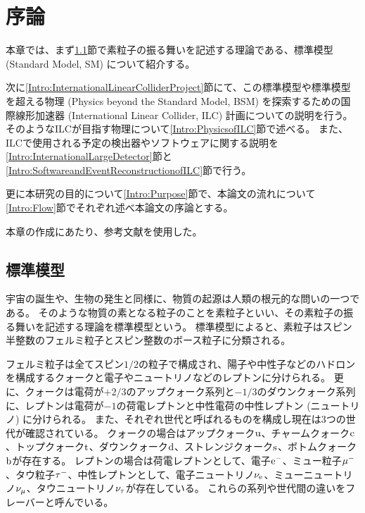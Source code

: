 
\chapter{序論} \label{chap:Introduction}

本章では、まず\ref{Intro:StandardModel}節で素粒子の振る舞いを記述する理論である、標準模型 (Standard Model, SM) について紹介する。

次に\ref{Intro:InternationalLinearColliderProject}節にて、この標準模型や標準模型を超える物理 (Physics beyond the Standard Model, BSM) を探索するための国際線形加速器 (International Linear Collider, ILC) 計画についての説明を行う。
そのようなILCが目指す物理について\ref{Intro:PhysicsofILC}節で述べる。
また、ILCで使用される予定の検出器やソフトウェアに関する説明を\ref{Intro:InternationalLargeDetector}節と\ref{Intro:SoftwareandEventReconstructionofILC}節で行う。

更に本研究の目的について\ref{Intro:Purpose}節で、本論文の流れについて\ref{Intro:Flow}節でそれぞれ述べ本論文の序論とする。

本章の作成にあたり、参考文献\cite{GlobalProject, InterimDesignReport}を使用した。


\section{標準模型} \label{Intro:StandardModel}

宇宙の誕生や、生物の発生と同様に、物質の起源は人類の根元的な問いの一つである。
そのような物質の素となる粒子のことを素粒子といい、その素粒子の振る舞いを記述する理論を標準模型という。
標準模型によると、素粒子はスピン半整数のフェルミ粒子とスピン整数のボース粒子に分類される。

フェルミ粒子は全てスピン$1/2$の粒子で構成され、陽子や中性子などのハドロンを構成するクォークと電子やニュートリノなどのレプトンに分けられる。
更に、クォークは電荷が$+2/3$のアップクォーク系列と$-1/3$のダウンクォーク系列に、レプトンは電荷が$-1$の荷電レプトンと中性電荷の中性レプトン (ニュートリノ) に分けられる。
また、それぞれ世代と呼ばれるものを構成し現在は3つの世代が確認されている。
クォークの場合はアップクォーク$\rm u$、チャームクォーク$\rm c$、トップクォーク$\rm t$、ダウンクォーク$\rm d$、ストレンジクォーク$\rm s$、ボトムクォーク$\rm b$が存在する。
レプトンの場合は荷電レプトンとして、電子$\rm e^-$、ミュー粒子$\rm \mu^-$、タウ粒子$\rm \tau^-$、中性レプトンとして、電子ニュートリノ$\rm \nu_e$、ミューニュートリノ$\rm \nu_{\mu}$、タウニュートリノ$\rm \nu_{\tau}$が存在している。
これらの系列や世代間の違いをフレーバーと呼んでいる。

